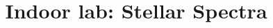 \documentclass[11pt, preprint]{aastex}
\begin{document}
\title{\bf Indoor lab: Stellar Spectra}

~
\vspace{-30pt}


\end{document}
